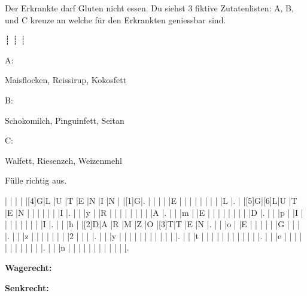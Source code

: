 \documentclass[11pt,twoside,a4paper]{exam}
\begin{document}
\begin{questions}
\vspace{0.1in}

  \question Der Erkrankte darf Gluten nicht essen. Du siehst 3 fiktive Zutatenlisten: A, B, und C kreuze an welche f\"ur den Erkrankten geniessbar sind.
     \begin{oneparcheckboxes}
     ┊ 
     ┊ 
  ┊    
     \end{oneparcheckboxes}

\vspace{0.3 in}
\begin{minipage}[t]{0.3\textwidth}
 A:

 Maisflocken, Reissirup, Kokosfett
\end{minipage}
\begin{minipage}[t]{0.3\textwidth}
 B: 

 Schokomilch, Pinguinfett, Seitan
\end{minipage}
\begin{minipage}[t]{0.3\textwidth}
 C:

 Walfett, Riesenzeh, Weizenmehl
\end{minipage}

\vspace{0.5 in}
\question F\"ulle richtig aus.

\begin{Puzzle}{15}{15}
  |{}  |{}  |{}  |{}  |[4]G|L   |U   |T   |E   |N   |I   |N   |{}  |[1]G|.
  |{}  |{}  |{}  |{}  |E   |{}  |{}  |{}  |{}  |{}  |{}  |{}  |{}  |L   |.
  |{}  |[5]G|[6]L|U   |T   |E   |N   |{}  |{}  |{}  |{}  |{}  |{}  |I   |.
  |{}  |{}  |y   |{}  |R   |{}  |{}  |{}  |{}  |{}  |{}  |{}  |{}  |A   |.
  |{}  |{}  |m   |{}  |E   |{}  |{}  |{}  |{}  |{}  |{}  |{}  |{}  |D   |.
  |{}  |{}  |p   |{}  |I   |{}  |{}  |{}  |{}  |{}  |{}  |{}  |{}  |I   |.
  |{}  |{}  |h   |{}  |[2]D|A   |R   |M   |Z   |O   |[3]T|T   |E   |N   |.
  |{}  |{}  |o   |{}  |E   |{}  |{}  |{}  |{}  |{}  |G   |{}  |{}  |{}  |.
  |{}  |{}  |z   |{}  |{}  |{}  |{}  |{}  |{}  |{}  |2   |{}  |{}  |{}  |.
  |{}  |{}  |y   |{}  |{}  |{}  |{}  |{}  |{}  |{}  |{}  |{}  |{}  |{}  |.
  |{}  |{}  |t   |{}  |{}  |{}  |{}  |{}  |{}  |{}  |{}  |{}  |{}  |{}  |.
  |{}  |{}  |e   |{}  |{}  |{}  |{}  |{}  |{}  |{}  |{}  |{}  |{}  |{}  |.
  |{}  |{}  |n   |{}  |{}  |{}  |{}  |{}  |{}  |{}  |{}  |{}  |{}  |{}  |.
\end{Puzzle}
\begin{PuzzleClues}{\textbf{Wagerecht:}}
\end{PuzzleClues}
\begin{PuzzleClues}{\textbf{Senkrecht:}}
\end{PuzzleClues}
\end{questions}
\end{document}
